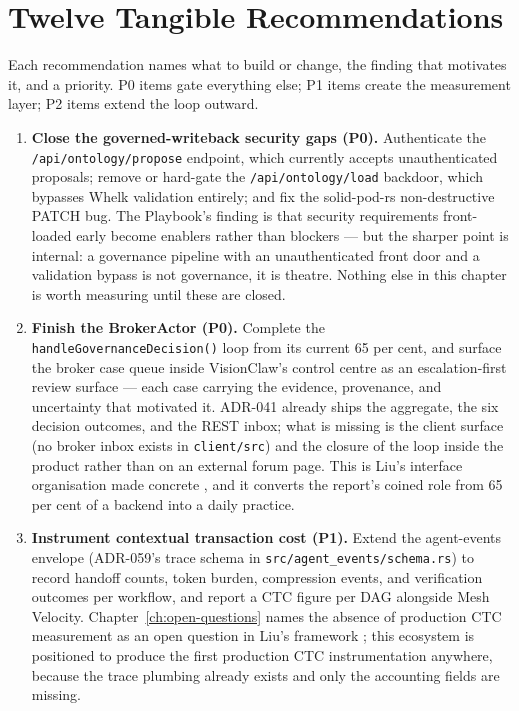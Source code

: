 \section{Twelve Tangible Recommendations}

Each recommendation names what to build or change, the finding that motivates it, and a priority. P0 items gate everything else; P1 items create the measurement layer; P2 items extend the loop outward.

\begin{enumerate}
  \item \textbf{Close the governed-writeback security gaps (P0).} Authenticate the \texttt{/api/\allowbreak ontology/\allowbreak propose} endpoint, which currently accepts unauthenticated proposals; remove or hard-gate the \texttt{/api/\allowbreak ontology/\allowbreak load} backdoor, which bypasses Whelk validation entirely; and fix the solid-pod-rs non-destructive PATCH bug. The Playbook's finding is that security requirements front-loaded early become enablers rather than blockers \parencite{Pereira2026Playbook} --- but the sharper point is internal: a governance pipeline with an unauthenticated front door and a validation bypass is not governance, it is theatre. Nothing else in this chapter is worth measuring until these are closed.

  \item \textbf{Finish the BrokerActor (P0).} Complete the \texttt{handleGovernanceDecision()} loop from its current 65 per cent, and surface the broker case queue inside VisionClaw's control centre as an escalation-first review surface --- each case carrying the evidence, provenance, and uncertainty that motivated it. ADR-041 already ships the aggregate, the six decision outcomes, and the REST inbox; what is missing is the client surface (no broker inbox exists in \texttt{client/src}) and the closure of the loop inside the product rather than on an external forum page. This is Liu's interface organisation made concrete \parencite{Liu2026}, and it converts the report's coined role from 65 per cent of a backend into a daily practice.

  \item \textbf{Instrument contextual transaction cost (P1).} Extend the agent-events envelope (ADR-059's trace schema in \texttt{src/agent\_events/schema.rs}) to record handoff counts, token burden, compression events, and verification outcomes per workflow, and report a CTC figure per DAG alongside Mesh Velocity. Chapter~\ref{ch:open-questions} names the absence of production CTC measurement as an open question in Liu's framework \parencite{Liu2026}; this ecosystem is positioned to produce the first production CTC instrumentation anywhere, because the trace plumbing already exists and only the accounting fields are missing.


\end{enumerate}
